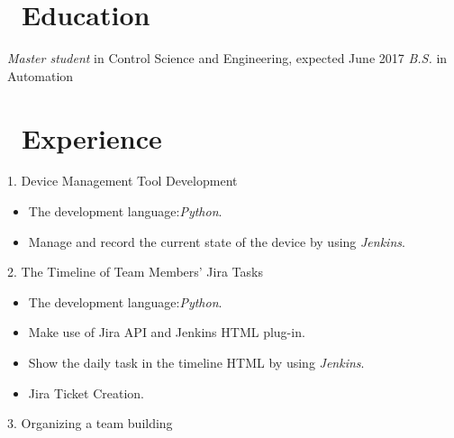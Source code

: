 \documentclass{resume}
\begin{document}


 
\section{\faGraduationCap\ Education}
\textit{Master student} in Control Science and Engineering, expected June 2017
\textit{B.S.} in Automation

\section{\faUsers\ Experience}
1. Device Management Tool Development
\begin{itemize}
  \item The development language:\emph{Python}.
  \item Manage and record the current state of the device by using \emph{Jenkins}.
\\
\end{itemize}
2. The Timeline of Team Members' Jira Tasks
\begin{itemize}
  \item The development language:\emph{Python}.
  \item Make use of Jira API and Jenkins HTML plug-in.
  \item Show the daily task in the timeline HTML by using \emph{Jenkins}.
  \item Jira Ticket Creation.
 \\
\end{itemize}
3. Organizing a team building


\end{document}

